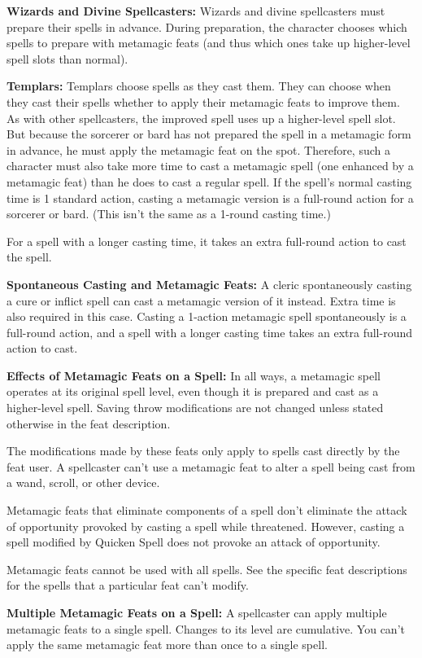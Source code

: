 \textbf{Wizards and Divine Spellcasters:} Wizards and divine spellcasters must prepare their spells in advance. During preparation, the character chooses which spells to prepare with metamagic feats (and thus which ones take up higher-level spell slots than normal).

\textbf{Templars:} Templars choose spells as they cast them. They can choose when they cast their spells whether to apply their metamagic feats to improve them. As with other spellcasters, the improved spell uses up a higher-level spell slot. But because the sorcerer or bard has not prepared the spell in a metamagic form in advance, he must apply the metamagic feat on the spot. Therefore, such a character must also take more time to cast a metamagic spell (one enhanced by a metamagic feat) than he does to cast a regular spell. If the spell’s normal casting time is 1 standard action, casting a metamagic version is a full-round action for a sorcerer or bard. (This isn’t the same as a 1-round casting time.)

For a spell with a longer casting time, it takes an extra full-round action to cast the spell.

\textbf{Spontaneous Casting and Metamagic Feats:} A cleric spontaneously casting a cure or inflict spell can cast a metamagic version of it instead. Extra time is also required in this case. Casting a 1-action metamagic spell spontaneously is a full-round action, and a spell with a longer casting time takes an extra full-round action to cast.

\textbf{Effects of Metamagic Feats on a Spell:} In all ways, a metamagic spell operates at its original spell level, even though it is prepared and cast as a higher-level spell. Saving throw modifications are not changed unless stated otherwise in the feat description.

The modifications made by these feats only apply to spells cast directly by the feat user. A spellcaster can’t use a metamagic feat to alter a spell being cast from a wand, scroll, or other device.

Metamagic feats that eliminate components of a spell don’t eliminate the attack of opportunity provoked by casting a spell while threatened. However, casting a spell modified by Quicken Spell does not provoke an attack of opportunity.

Metamagic feats cannot be used with all spells. See the specific feat descriptions for the spells that a particular feat can’t modify.

\textbf{Multiple Metamagic Feats on a Spell:} A spellcaster can apply multiple metamagic feats to a single spell. Changes to its level are cumulative. You can’t apply the same metamagic feat more than once to a single spell.

